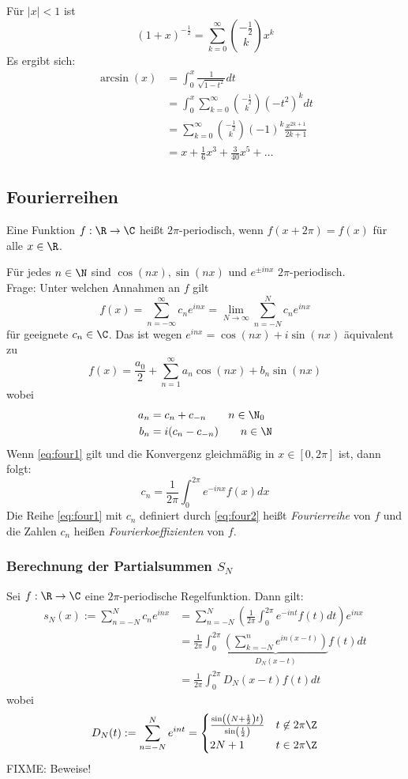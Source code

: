 \documentclass[a4paper,10pt]{scrartcl}
\begin{document}
\begin{thm}
\begin{ex*}
Für $|x|<1$  ist
\[
(1+x)^{-\frac 12} = \sum_{k=0}^\infty\binom{-\frac 12}kx^k
\]
Es ergibt sich:
\begin{align*}
\arcsin(x)&=\int_0^x\frac 1{\sqrt{1-t^2}}dt\\
&=\int_0^x\sum_{k=0}^\infty\binom{-\frac 12}k(-t^2)^kdt\\
&=\sum_{k=0}^\infty\binom{-\frac 12}k(-1)^k\frac{x^{2k+1}}{2k+1}\\
&=x+\frac 16x^3+\frac 3{40}x^5+…
\end{align*}
\end{ex*}
\end{thm}

\subsection{Fourierreihen}

Eine Funktion $f:\R\to\C$ heißt $2\pi$-periodisch, wenn $f(x+2\pi)=f(x)$ für alle $x\in\R$.

Für jedes $n\in\N$ sind $\cos(nx), \sin(nx)$ und $e^{\pm inx}$ $2\pi$-periodisch.\\
Frage: Unter welchen Annahmen an $f$ gilt
\[
\label{eq:four1}
f(x)=\sum_{n=-\infty}^\infty c_ne^{inx}=\lim_{N\to\infty}\sum_{n=-N}^Nc_ne^{inx}
\]
für geeignete $c_n\in\C$.
Das ist wegen $e^{inx}=\cos(nx) +i\sin(nx)$ äquivalent zu
\[
f(x)=\frac{a_0}2+\sum_{n=1}^\infty a_n\cos(nx)+b_n\sin(nx)
\]
wobei
\begin{align*}
a_n&=c_n+c_{-n} \qquad n\in\N_0\\
 b_n&=i(c_n-c_{-n}) \qquad n\in\N
\end{align*}
Wenn \eqref{eq:four1} gilt und die Konvergenz gleichmäßig in $x\in[0,2\pi]$ ist, dann folgt:
\[
\label{eq:four2}
c_n=\frac 1{2\pi}\int_0^{2\pi}e^{-inx}f(x)dx
\]
Die Reihe \eqref{eq:four1} mit $c_n$ definiert durch \eqref{eq:four2} heißt \emph{Fourierreihe} von $f$ und die Zahlen $c_n$ heißen \emph{Fourierkoeffizienten} von $f$.

\subsubsection*{Berechnung der Partialsummen $S_N$}

Sei $f:\R\to\C$ eine $2\pi$-periodische Regelfunktion.
Dann gilt:
\begin{align*}
s_N(x):=\sum_{n=-N}^Nc_ne^{inx}
&=\sum_{n=-N}^N\left(\frac 1{2\pi}\int_0^{2\pi}e^{-int}f(t)dt\right)e^{inx}\\
&=\frac 1{2\pi}\int_0^{2\pi}\underbrace{\left(\sum_{k=-N}^ne^{in(x-t)}\right)}_{D_N(x-t)}f(t)dt\\
&=\frac 1{2\pi}\int_0^{2\pi}D_N(x-t)f(t)dt
\end{align*}
wobei
\[
D_N(t):=\sum_{n=-N}^Ne^{int}=\begin{cases}
\frac{\sin\left(\left(N+\frac 12\right)t\right)}{\sin\left(\frac t2\right)} & t\not\in 2\pi\Z\\
2N+1 & t\in 2\pi\Z
\end{cases}
\]
FIXME: Beweise!
\end{document}
